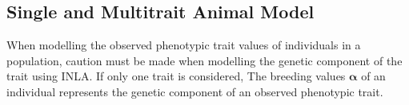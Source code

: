 \subsection{Single and Multitrait Animal Model}
When modelling the observed phenotypic trait values of individuals in a population, caution must be made when modelling the genetic component of the trait using INLA.
If only one trait is considered, 
The breeding values $\boldsymbol{\alpha}$ of an individual represents the genetic component of an observed phenotypic trait. 











